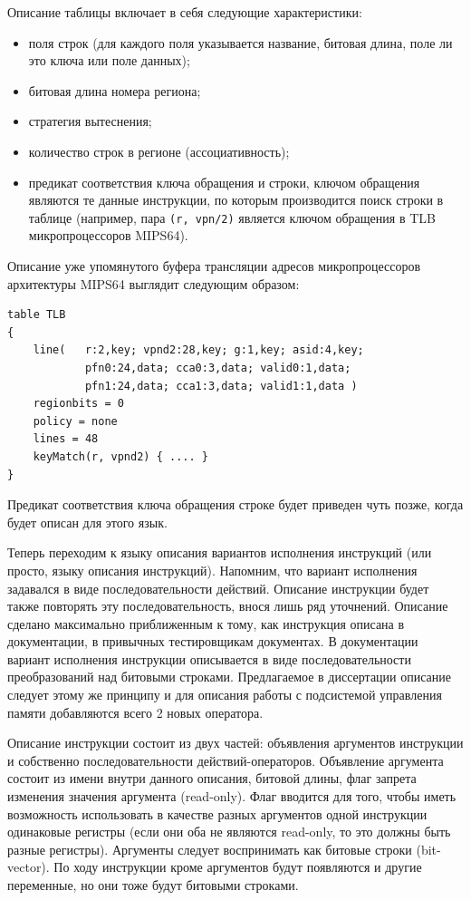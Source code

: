 Описание таблицы включает в себя следующие характеристики:
\begin{itemize}
    \item поля строк (для каждого поля указывается название, битовая длина, поле
ли это ключа или поле данных);
    \item битовая длина номера региона;
    \item стратегия вытеснения;
    \item количество строк в регионе (ассоциативность);
    \item предикат соответствия ключа обращения и строки, ключом обращения
являются те данные инструкции, по которым производится поиск строки в таблице
(например, пара \texttt{(r, vpn/2)} является ключом обращения в TLB
микропроцессоров MIPS64).
\end{itemize}

Описание уже упомянутого буфера трансляции адресов микропроцессоров архитектуры
MIPS64 выглядит следующим образом:
\begin{verbatim}
table TLB
{
    line(   r:2,key; vpnd2:28,key; g:1,key; asid:4,key;
            pfn0:24,data; cca0:3,data; valid0:1,data;
            pfn1:24,data; cca1:3,data; valid1:1,data )
    regionbits = 0
    policy = none
    lines = 48
    keyMatch(r, vpnd2) { .... }
}
\end{verbatim}

Предикат соответствия ключа обращения строке будет приведен чуть позже, когда
будет описан для этого язык.

Теперь переходим к языку описания вариантов исполнения инструкций (или просто,
языку описания инструкций). Напомним, что вариант исполнения задавался в виде
последовательности действий. Описание инструкции будет также повторять эту
последовательность, внося лишь ряд уточнений. Описание сделано максимально
приближенным к тому, как инструкция описана в документации, в привычных
тестировщикам документах. В документации вариант исполнения инструкции
описывается в виде последовательности преобразований над битовыми строками.
Предлагаемое в диссертации описание следует этому же принципу и для описания
работы с подсистемой управления памяти добавляются всего 2 новых оператора.

Описание инструкции состоит из двух частей: объявления аргументов инструкции и
собственно последовательности действий-операторов. Объявление аргумента состоит
из имени внутри данного описания, битовой длины, флаг запрета изменения значения
аргумента (read-only). Флаг вводится для того, чтобы иметь возможность
использовать в качестве разных аргументов одной инструкции одинаковые регистры
(если они оба не являются read-only, то это должны быть разные регистры).
Аргументы следует воспринимать как битовые строки (bit-vector). По ходу
инструкции кроме аргументов будут появляются и другие переменные, но они тоже
будут битовыми строками.

